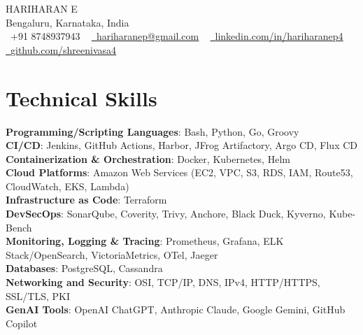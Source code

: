 \documentclass[letterpaper,11pt]{article}
\begin{document}
\begin{center}
    {\Huge \scshape HARIHARAN E} \\ \vspace{1pt}
    Bengaluru, Karnataka, India \\ \vspace{1pt}
    \small \raisebox{-0.1\height}\faPhone\ +91 8748937943 ~ \href{mailto:hariharanep@gmail.com}{\raisebox{-0.2\height}\faEnvelope\  \underline{hariharanep@gmail.com}} ~
    \href{https://linkedin.com/in/hariharanep4/}{\raisebox{-0.2\height}\faLinkedin\ \underline{linkedin.com/in/hariharanep4}}  ~
    \href{https://github.com/shreenivasa4/}{\raisebox{-0.2\height}\faGithub\ \underline{github.com/shreenivasa4}}
    \vspace{-8pt}
\end{center}


\section{Technical Skills}
 \begin{itemize}[leftmargin=0.15in, label={}]
    \small{\item{
     \textbf{Programming/Scripting Languages}{: Bash, Python, Go, Groovy} \\
     \textbf{CI/CD}{: Jenkins, GitHub Actions, Harbor, JFrog Artifactory, Argo CD, Flux CD} \\
     \textbf{Containerization \& Orchestration}{: Docker, Kubernetes, Helm} \\
     \textbf{Cloud Platforms}{: Amazon Web Services (EC2, VPC, S3, RDS, IAM, Route53, CloudWatch, EKS, Lambda)} \\
     \textbf{Infrastructure as Code}{: Terraform} \\
     \textbf{DevSecOps}{: SonarQube, Coverity, Trivy, Anchore, Black Duck, Kyverno, Kube-Bench} \\
     \textbf{Monitoring, Logging \& Tracing}{: Prometheus, Grafana, ELK Stack/OpenSearch, VictoriaMetrics, OTel, Jaeger} \\
     \textbf{Databases}{: PostgreSQL, Cassandra} \\
     \textbf{Networking and Security}{: OSI, TCP/IP, DNS, IPv4, HTTP/HTTPS, SSL/TLS, PKI} \\
     \textbf{GenAI Tools}{: OpenAI ChatGPT, Anthropic Claude, Google Gemini, GitHub Copilot}
    }}
 \end{itemize}
 \vspace{-16pt}
\end{document}
